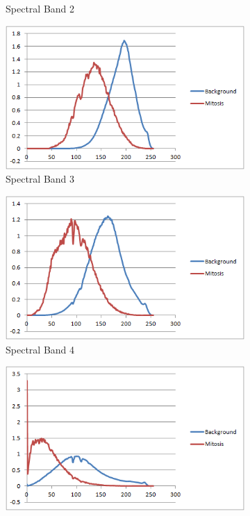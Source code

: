 \documentclass[10pt,twocolumn,letterpaper]{article}
\begin{document}
\begin{figure}[b]
\begin{subfigure}[b]{0.22\textwidth}
		\caption*{Spectral Band 2}
	\end{subfigure}
	\begin{subfigure}[b]{0.22\textwidth}
		\includegraphics[width=\textwidth]{diagrams/Band3.png}
		\caption*{Spectral Band 3}
	\end{subfigure}
	\begin{subfigure}[b]{0.22\textwidth}
		\includegraphics[width=\textwidth]{diagrams/Band4.png}
		\caption*{Spectral Band 4}
	\end{subfigure}
	\begin{subfigure}[b]{0.22\textwidth}
		\includegraphics[width=\textwidth]{diagrams/Band5.png}

\end{subfigure}
\end{figure}
\end{document}
